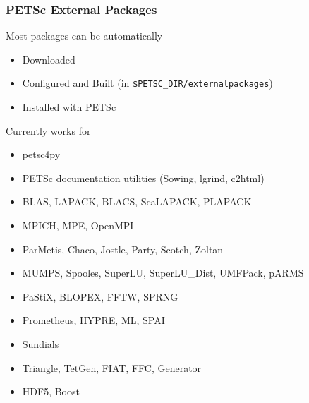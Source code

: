 \begin{frame}[fragile]
\frametitle{PETSc External Packages}

\begin{block}{Most packages can be automatically}
  \begin{itemize}  \vspace*{-0.2cm}
    \item Downloaded
    \item Configured and Built (in \lstinline|$PETSC_DIR/externalpackages|)
    \item Installed with PETSc
  \end{itemize}
\end{block} \vspace*{-0.2cm}
  
\begin{block}{Currently works for}
  \begin{itemize}  \vspace*{-0.2cm}
    \item petsc4py
    \item PETSc documentation utilities (Sowing, lgrind, c2html)
    \item BLAS, LAPACK, BLACS, ScaLAPACK, PLAPACK
    \item MPICH, MPE, OpenMPI
    \item ParMetis, Chaco, Jostle, Party, Scotch, Zoltan
    \item MUMPS, Spooles, SuperLU, SuperLU\_Dist, UMFPack, pARMS
    \item PaStiX, BLOPEX, FFTW, SPRNG
    \item Prometheus, HYPRE, ML, SPAI
    \item Sundials
    \item Triangle, TetGen, FIAT, FFC, Generator
    \item HDF5, Boost
  \end{itemize}
\end{block}

\end{frame}
